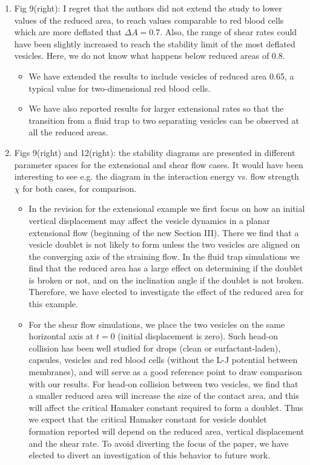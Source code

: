 \documentclass[11pt]{article}
\newcommand{\comment}[1]{{\color{blue} #1}}
\begin{document}
\begin{enumerate}
\item\comment{Fig 9(right): I regret that the authors did not extend the study
to lower values of the reduced area, to reach values comparable to red
blood cells which are more deflated that $\Delta A=0.7$. Also, the range
of shear rates could have been slightly increased to reach the
stability limit of the most deflated vesicles. Here, we do not know
what happens below reduced areas of 0.8.}
\begin{itemize}
  \item We have extended the results to include vesicles of reduced area
    0.65, a typical value for two-dimensional red blood cells.
  \item We have also reported results for larger extensional rates so
    that the transition from a fluid trap to two separating vesicles can
    be observed at all the reduced areas.
\end{itemize}

\item\comment{ Figs 9(right) and 12(right): the stability diagrams are presented
in different parameter spaces for the extensional and shear flow
cases. It would have been interesting to see e.g. the diagram in the
interaction energy vs. flow strength $\chi$ for both cases, for
comparison.}
\begin{itemize}
  \item In the revision for the extensional example we first focus on how an initial vertical displacement 
  may affect the vesicle dynamics in a planar extensional flow (beginning of the new Section III). 
  There we find that a vesicle doublet is not likely to form unless the two vesicles are aligned
  on the converging axis of the straining flow. In the fluid trap simulations we find that
    the reduced area has a large effect
    on determining if the doublet is broken or not, and on the
    inclination angle if the doublet is not broken.  Therefore, we have
    elected to investigate the effect of the reduced area for this
    example.

  \item For the shear flow simulations, we place the two vesicles on the same horizontal axis at $t=0$ (initial displacement is zero).
  Such head-on collision has been well studied for drops (clean or surfactant-laden), capsules, vesicles and red blood cells (without the L-J potential between membranes),
  and will serve as a good reference point to draw comparison with our results. For head-on collision between two vesicles,
  we find that  a smaller reduced area will increase the
    size of the contact area, and this will affect the critical
    Hamaker constant required to form a doublet. Thus we expect that the critical Hamaker constant for vesicle doublet formation reported will depend on the
    reduced area, vertical displacement and the shear rate. 
    To avoid
    diverting the focus of the paper, we have elected to divert an
    investigation of this behavior to future work.
\end{itemize}


\end{enumerate}
\end{document}

